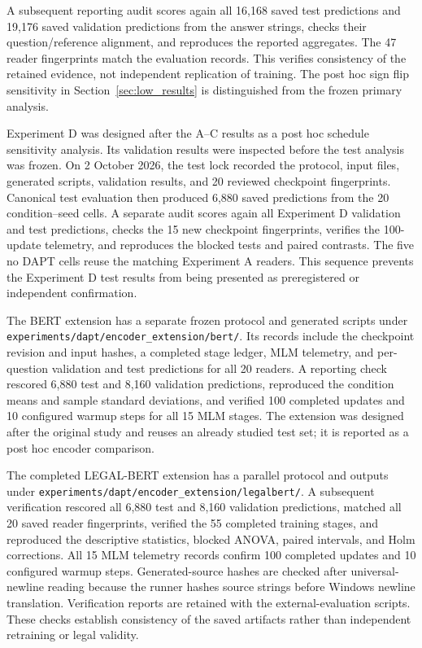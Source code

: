 \documentclass[pdflatex,sn-basic]{sn-jnl}
\begin{document}
A subsequent reporting audit scores again all 16,168 saved test predictions and
19,176 saved validation predictions from the answer strings, checks their
question/reference alignment, and reproduces the reported aggregates.
The 47 reader fingerprints match the evaluation records.
This verifies consistency of the retained evidence, not independent
replication of training. The post hoc sign flip sensitivity in
Section~\ref{sec:low_results} is distinguished from the frozen primary analysis.

Experiment D was designed after the A--C results as a post hoc schedule
sensitivity analysis. Its validation results were inspected before the test
analysis was frozen. On 2 October 2026, the test lock recorded the protocol,
input files, generated scripts, validation results, and 20 reviewed checkpoint
fingerprints. Canonical test evaluation then produced 6,880 saved predictions
from the 20 condition--seed cells. A separate audit scores again all Experiment D
validation and test predictions, checks the 15 new checkpoint fingerprints,
verifies the 100-update telemetry, and reproduces the blocked tests and paired
contrasts. The five no DAPT cells reuse the matching Experiment A readers.
This sequence prevents the Experiment D test results from being presented as
preregistered or independent confirmation.

The BERT extension has a separate frozen protocol and generated scripts under
\texttt{experiments/dapt/encoder\_extension/bert/}. Its records include
the checkpoint revision and input hashes, a completed stage ledger, MLM
telemetry, and per-question validation and test predictions for all 20 readers.
A reporting check rescored 6,880 test and 8,160 validation predictions,
reproduced the condition means and sample standard deviations, and verified
100 completed updates and 10 configured warmup steps for all 15 MLM stages.
The extension was designed after the original study and reuses an already
studied test set; it is reported as a post hoc encoder comparison.

The completed LEGAL-BERT extension has a parallel protocol and outputs under
\texttt{experiments/dapt/encoder\_extension/legalbert/}. A subsequent
verification rescored all 6,880 test and 8,160 validation predictions, matched
all 20 saved reader fingerprints, verified the 55 completed training stages,
and reproduced the descriptive statistics, blocked ANOVA, paired intervals,
and Holm corrections. All 15 MLM telemetry records confirm 100 completed
updates and 10 configured warmup steps. Generated-source hashes are checked
after universal-newline reading because the runner hashes source strings
before Windows newline translation. Verification reports are retained with
the external-evaluation scripts. These checks establish consistency of the
saved artifacts rather than independent retraining or legal validity.
\end{document}
